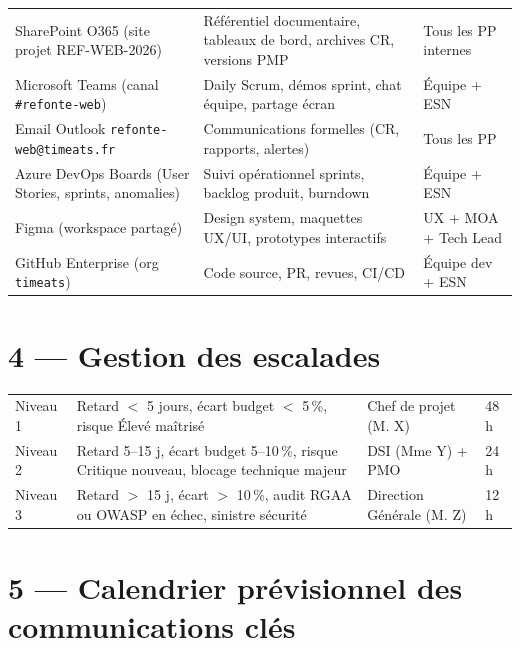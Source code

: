 \documentclass[11pt,a4paper,oneside]{report}
\begin{document}
\renewcommand{\arraystretch}{1.3}
\begin{tabularx}{\textwidth}{L{4cm} Y L{3cm}}
\toprule
{} &  &  \\
\midrule
SharePoint O365 (site projet REF-WEB-2026) & Référentiel documentaire, tableaux de bord, archives CR, versions PMP & Tous les PP internes \\
Microsoft Teams (canal \texttt{\#refonte-web}) & Daily Scrum, démos sprint, chat équipe, partage écran & Équipe + ESN \\
Email Outlook \texttt{refonte-web@timeats.fr} & Communications formelles (CR, rapports, alertes) & Tous les PP \\
Azure DevOps Boards (User Stories, sprints, anomalies) & Suivi opérationnel sprints, backlog produit, burndown & Équipe + ESN \\
Figma (workspace partagé) & Design system, maquettes UX/UI, prototypes interactifs & UX + MOA + Tech Lead \\
GitHub Enterprise (org \texttt{timeats}) & Code source, PR, revues, CI/CD & Équipe dev + ESN \\
\bottomrule
\end{tabularx}

\section*{4 --- Gestion des escalades}

\renewcommand{\arraystretch}{1.3}
\begin{tabularx}{\textwidth}{L{2.5cm} Y L{3.5cm} L{2.5cm}}
\toprule
{} &  &  &  \\
\midrule
Niveau 1 & Retard $<$ 5 jours, écart budget $<$ 5\,\%, risque Élevé maîtrisé & Chef de projet (M. X) & 48 h \\
Niveau 2 & Retard 5--15 j, écart budget 5--10\,\%, risque Critique nouveau, blocage technique majeur & DSI (Mme Y) + PMO & 24 h \\
Niveau 3 & Retard $>$ 15 j, écart $>$ 10\,\%, audit RGAA ou OWASP en échec, sinistre sécurité & Direction Générale (M. Z) & 12 h \\
\bottomrule
\end{tabularx}

\section*{5 --- Calendrier prévisionnel des communications clés}
\end{document}
